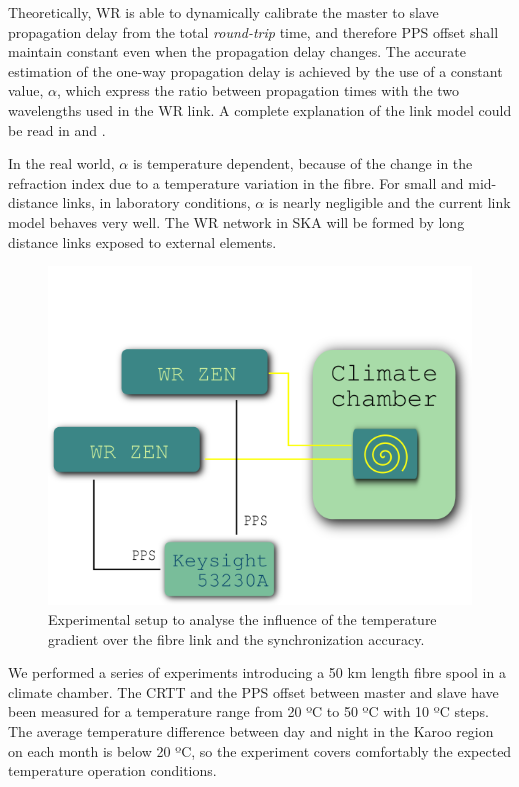 Theoretically, WR is able to dynamically calibrate the master to slave 
propagation delay from the total \textit{round-trip} time, and therefore PPS 
offset shall maintain constant even when the propagation delay changes. The 
accurate estimation of the one-way propagation delay is achieved by the use of 
a constant value, $\alpha$, which express the ratio between propagation times 
with the two wavelengths used in the WR link. A complete explanation of the 
link model could be read in \cite{Wlostowski2011} and \cite{Daniluk2012}.

In the real world, $\alpha$ is temperature dependent, because of the change in 
the refraction index due to a temperature variation in the fibre. For small and 
mid-distance links, in laboratory conditions, $\alpha$ is nearly negligible and 
the current link model behaves very well. The WR network in SKA will be formed 
by long distance links exposed to external elements. 


\begin{figure}
	\centering
	\includegraphics[width=0.7\linewidth]{img/tempsetup}
	\caption[Configuration of the climate chamber experiments]{Experimental 
		setup to analyse the influence of the temperature gradient over the 
		fibre link and the synchronization accuracy.}
	\label{fig:tempsetup}
\end{figure}

We performed a series of experiments introducing a 50 km length fibre spool in 
a climate chamber. The CRTT and the PPS offset between master and slave have 
been measured for a temperature range from 20 ºC to 50 ºC with 10 ºC steps. 
The average temperature difference between day and night in the Karoo region on 
each month is below 20 ºC, so the experiment covers comfortably the expected 
temperature operation conditions.

